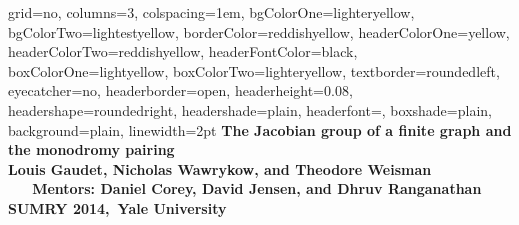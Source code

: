 \documentclass[landscape,final,columns=3]{baposter}
\begin{document}
\begin{poster}{
  grid=no,
  columns=3,
   colspacing=1em,
  bgColorOne=lighteryellow, %
  bgColorTwo=lightestyellow, %
  borderColor=reddishyellow,
  headerColorOne=yellow,
  headerColorTwo=reddishyellow,
  headerFontColor=black,
  boxColorOne=lightyellow,
  boxColorTwo=lighteryellow,
  textborder=roundedleft,
  eyecatcher=no,
  headerborder=open,
  headerheight=0.08\textheight,
  headershape=roundedright,
  headershade=plain,
  headerfont=\Large\textsf, %
  boxshade=plain,
  background=plain,
  linewidth=2pt
  }
  {
  }
{\bf{\textcolor{mit}{The Jacobian group of a finite graph and the monodromy pairing}} %
{\rm \\ \large  Louis Gaudet, Nicholas Wawrykow, and Theodore Weisman \ \ \
 \textbf{Mentors:} Daniel Corey, David Jensen, and Dhruv Ranganathan \\
 SUMRY 2014,\ Yale University
  }}



\end{poster}
\end{document}
